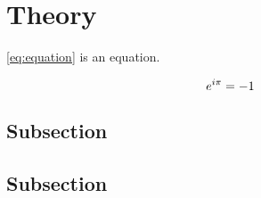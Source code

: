 \section{Theory}

\eqref{eq:equation} is an equation.

\begin{equation}
e^{i\pi} = -1
\label{eq:equation}
\end{equation}

\subsection{Subsection}


\subsection{Subsection}

